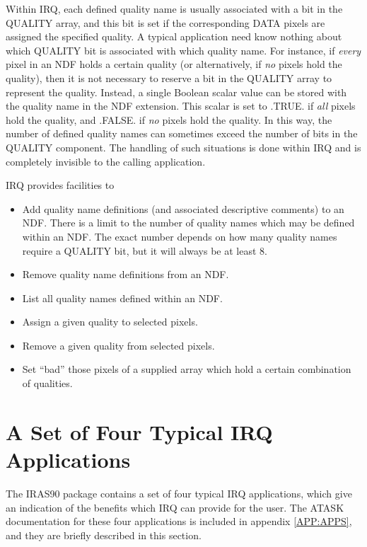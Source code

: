Within IRQ, each defined quality name is usually associated with a bit in the
QUALITY array, and this bit is set if the corresponding DATA pixels are assigned
the specified quality. A typical application need know nothing about which
QUALITY bit is associated with which quality name. For instance, if {\em every}
pixel in an NDF holds a certain quality (or alternatively, if {\em no} pixels
hold the quality), then it is not necessary to reserve a bit in the QUALITY
array to represent the quality. Instead, a single Boolean scalar value can be
stored with the quality name in the NDF extension. This scalar is set to .TRUE.
if {\em all} pixels hold the quality, and .FALSE. if {\em no} pixels hold the
quality. In this way, the number of defined quality names can sometimes exceed
the number of bits in the QUALITY component. The handling of such situations is
done within IRQ and is completely invisible to the calling application.

IRQ provides facilities to
\begin{itemize}
\item Add quality name definitions (and associated descriptive comments) to an
NDF. There is a limit to the number of quality names which may be defined within
an NDF. The exact number depends on how many quality names require a QUALITY
bit, but it will always be at least 8.
\item Remove quality name definitions from an NDF.
\item List all quality names defined within an NDF.
\item Assign a given quality to selected pixels.
\item Remove a given quality from selected pixels.
\item Set ``bad'' those pixels of a supplied array which hold a certain
combination of qualities.
\end{itemize}

\section {A Set of Four Typical IRQ Applications}
The IRAS90 package contains a set of four typical IRQ applications, which give
an indication of the benefits which IRQ can provide for the user. The ATASK
documentation for these four applications is included in appendix
\ref{APP:APPS}, and they are briefly described in this section.
